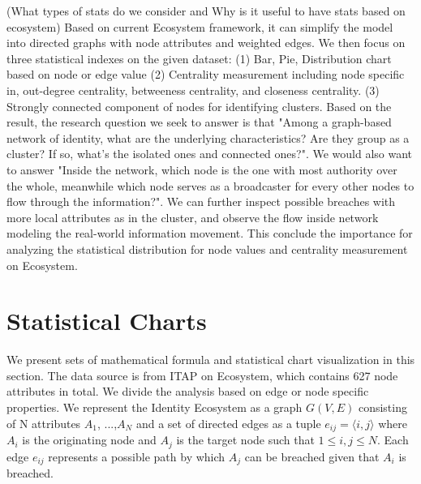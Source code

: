 \documentclass[letterpaper, 10 pt, conference]{ieeeconf}  %
\begin{document}
(What types of stats do we consider and Why is it useful to have stats based on ecosystem)
Based on current Ecosystem framework, it can simplify the model into directed graphs with node attributes and weighted edges. We then focus on three statistical indexes on the given dataset: (1) Bar, Pie, Distribution chart based on node or edge value (2) Centrality measurement including node specific in, out-degree centrality, betweeness centrality, and closeness centrality. (3) Strongly  connected  component of nodes for identifying clusters. Based on the result, the research question we seek to answer is that "Among a graph-based network of identity, what are the underlying characteristics? Are they group as a cluster? If so, what's the isolated ones and connected ones?". We would also want to answer "Inside the network, which node is the one with most authority over the whole, meanwhile which node serves as a broadcaster for every other nodes to flow through the information?". We can further inspect possible breaches with more local attributes as in the cluster, and observe the flow inside network modeling the real-world information movement. This conclude the importance for analyzing the statistical distribution for node values and centrality measurement on Ecosystem.

\section{Statistical Charts}
We present sets of mathematical formula and statistical chart visualization in this section. The data source is from ITAP on Ecosystem, which contains 627 node attributes in total. We divide the analysis based on edge or node specific properties. We represent the Identity Ecosystem as a graph $G(V, E)$ consisting of N attributes $A_{1}$, ...,$A_{N}$ and a set of directed edges as a tuple
$e_{ij} = \langle i, j \rangle$ where $A_{i}$
is the originating node and $A_{j}$
is the target node such that $1 \leq i, j \leq N$. Each edge $e_{ij}$ represents a possible path by which $A_{j}$ can be breached given that $A_{i}$ is breached.
\end{document}

